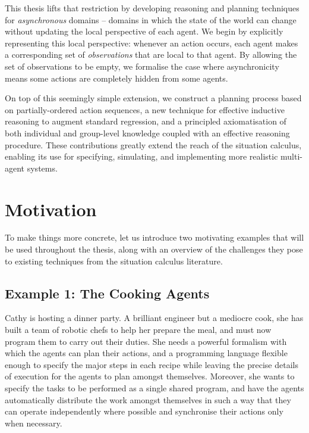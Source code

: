 This thesis lifts that restriction by developing reasoning and planning
techniques for \emph{asynchronous} domains -- domains in which the
state of the world can change without updating the local perspective
of each agent. We begin by explicitly representing this local perspective:
whenever an action occurs, each agent makes a corresponding set of
\emph{observations} that are local to that agent. By allowing the
set of observations to be empty, we formalise the case where asynchronicity
means some actions are completely hidden from some agents.

On top of this seemingly simple extension, we construct a planning
process based on partially-ordered action sequences, a new technique
for effective inductive reasoning to augment standard regression,
and a principled axiomatisation of both individual and group-level
knowledge coupled with an effective reasoning procedure. These contributions
greatly extend the reach of the situation calculus, enabling its use
for specifying, simulating, and implementing more realistic multi-agent
systems.


\section{Motivation}

To make things more concrete, let us introduce two motivating examples
that will be used throughout the thesis, along with an overview of
the challenges they pose to existing techniques from the situation
calculus literature.


\subsection*{Example 1: The Cooking Agents}

Cathy is hosting a dinner party. A brilliant engineer but a mediocre
cook, she has built a team of robotic chefs to help her prepare the
meal, and must now program them to carry out their duties. She needs
a powerful formalism with which the agents can plan their actions,
and a programming language flexible enough to specify the major steps
in each recipe while leaving the precise details of execution for
the agents to plan amongst themselves. Moreover, she wants to specify
the tasks to be performed as a single shared program, and have the
agents automatically distribute the work amongst themselves in such
a way that they can operate independently where possible and synchronise
their actions only when necessary.\\


